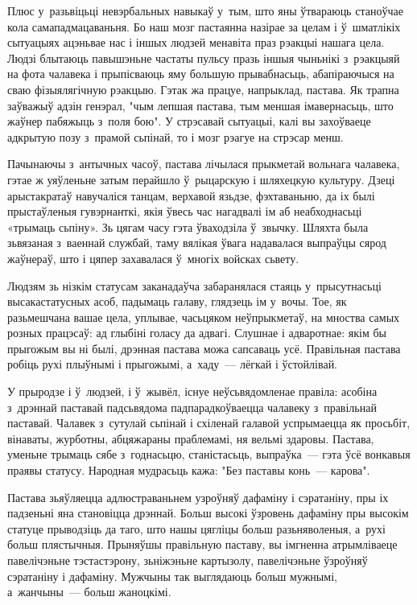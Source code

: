 Плюс у~разьвіцьці невэрбальных навыкаў у~тым, што яны ўтвараюць станоўчае кола самападмацаваньня. Бо наш мозг пастаянна назірае за целам і ў~шматлікіх сытуацыях ацэньвае нас і іншых людзей менавіта праз рэакцыі нашага цела. Людзі блытаюць павышэньне частаты пульсу празь іншыя чыньнікі з~рэакцыяй на фота чалавека і прыпісваюць яму большую прывабнасьць, абапіраючыся на сваю фізыялягічную рэакцыю. Гэтак жа працуе, напрыклад, пастава. Як трапна заўважыў адзін генэрал, "чым лепшая пастава, тым меншая імавернасьць, што жаўнер пабяжыць з~поля бою". У стрэсавай сытуацыі, калі вы захоўваеце адкрытую позу з~прамой сьпінай, то і мозг рэагуе на стрэсар менш.

Пачынаючы з~антычных часоў, пастава лічылася прыкметай вольнага чалавека, гэтае ж уяўленьне затым перайшло ў~рыцарскую і шляхецкую культуру. Дзеці арыстакратаў навучаліся танцам, верхавой язьдзе, фэхтаваньню, да іх былі прыстаўленыя гувэрнанткі, якія ўвесь час нагадвалі ім аб неабходнасьці «трымаць сьпіну». Зь цягам часу гэта ўваходзіла ў~звычку. Шляхта была зьвязаная з~ваеннай службай, таму вялікая ўвага надавалася выпраўцы сярод жаўнераў, што і цяпер захавалася ў~многіх войсках сьвету.

Людзям зь нізкім статусам заканадаўча забаранялася стаяць у~прысутнасьці высакастатусных асоб, падымаць галаву, глядзець ім у~вочы. Тое, як разьмешчана вашае цела, уплывае, часьцяком неўпрыкметаў, на мноства самых розных працэсаў: ад глыбіні голасу да адвагі. Слушнае і адваротнае: якім бы прыгожым вы ні былі, дрэнная пастава можа сапсаваць усё. Правільная пастава робіць рухі плыўнымі і прыгожымі, а~хаду~--- лёгкай і ўстойлівай.

У прыродзе і ў~людзей, і ў~жывёл, існуе неўсьвядомленае правіла: асобіна з~дрэннай паставай падсьвядома падпарадкоўваецца чалавеку з~правільнай паставай. Чалавек з~сутулай сьпінай і схіленай галавой успрымаецца як просьбіт, вінаваты, журботны, абцяжараны праблемамі, ня вельмі здаровы. Пастава, уменьне трымаць сябе з~годнасьцю, станістасьць, выпраўка~--- гэта ўсё вонкавыя праявы статусу. Народная мудрасьць кажа: "Без паставы конь~--- карова".

Пастава зьяўляецца адлюстраваньнем узроўняў дафаміну і сэратаніну, пры іх падзеньні яна становіцца дрэннай. Больш высокі ўзровень дафаміну пры высокім статуце прыводзіць да таго, што нашы цягліцы больш разьняволеныя, а~рухі больш плястычныя. Прыняўшы правільную паставу, вы імгненна атрымліваеце павелічэньне тэстастэрону, зьніжэньне картызолу, павелічэньне ўзроўняў сэратаніну і дафаміну. Мужчыны так выглядаюць больш мужнымі, а~жанчыны~--- больш жаноцкімі.

